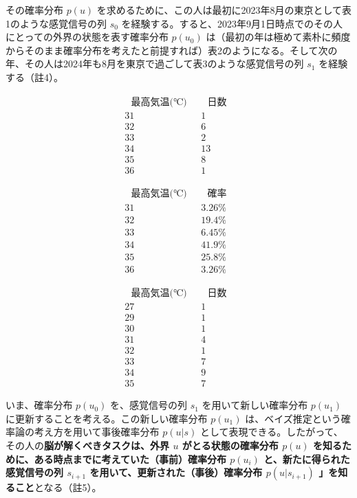 その確率分布 \(p(u)\)
を求めるために、この人は最初に2023年8月の東京として表1のような感覚信号の列
\(s_0\)
を経験する。すると、2023年9月1日時点でのその人にとっての外界の状態を表す確率分布
\(p(u_0)\)
は（最初の年は極めて素朴に頻度からそのまま確率分布を考えたと前提すれば）表2のようになる。そして次の年、その人は2024年も8月を東京で過ごして表3のような感覚信号の列
\(s_1\) を経験する（註4）。

\[
\begin{array}{cc}
~~~\textrm{最高気温(℃)}~~~ & ~~~\textrm{日数}~~~ \\
\hline
\textrm{31} & \textrm{1} \\
\textrm{32} & \textrm{6} \\
\textrm{33} & \textrm{2} \\
\textrm{34} & \textrm{13} \\
\textrm{35} & \textrm{8} \\
\textrm{36} & \textrm{1}
\end{array}
\tag{表1}
\]

\[
\begin{array}{cc}
~~~\textrm{最高気温(℃)}~~~ & ~~~\textrm{確率}~~~ \\
\hline
\textrm{31} & \textrm{3.26\%} \\
\textrm{32} & \textrm{19.4\%} \\
\textrm{33} & \textrm{6.45\%} \\
\textrm{34} & \textrm{41.9\%} \\
\textrm{35} & \textrm{25.8\%} \\
\textrm{36} & \textrm{3.26\%}
\end{array}
\tag{表2}
\]

\[
\begin{array}{cc}
~~~\textrm{最高気温(℃)}~~~ & ~~~\textrm{日数}~~~ \\
\hline
\textrm{27} & \textrm{1} \\
\textrm{29} & \textrm{1} \\
\textrm{30} & \textrm{1} \\
\textrm{31} & \textrm{4} \\
\textrm{32} & \textrm{1} \\
\textrm{33} & \textrm{7} \\
\textrm{34} & \textrm{9} \\
\textrm{35} & \textrm{7}
\end{array}
\tag{表3}
\]

いま、確率分布 \(p(u_0)\) を、感覚信号の列 \(s_1\)
を用いて新しい確率分布 \(p(u_1)\)
に更新することを考える。この新しい確率分布 \(p(u_1)\)
は、ベイズ推定という確率論の考え方を用いて事後確率分布 \(p(u|s)\)
として表現できる。したがって、その人の\textbf{脳が解くべきタスクは、外界
\(u\) がとる状態の確率分布 \(p(u)\)
を知るために、ある時点までに考えていた（事前）確率分布 \(p(u_i)\)
と、新たに得られた感覚信号の列 \(s_{i+1}\)
を用いて、更新された（事後）確率分布 \(p(u|s_{i+1})\)
」を知ること}となる（註5）。

